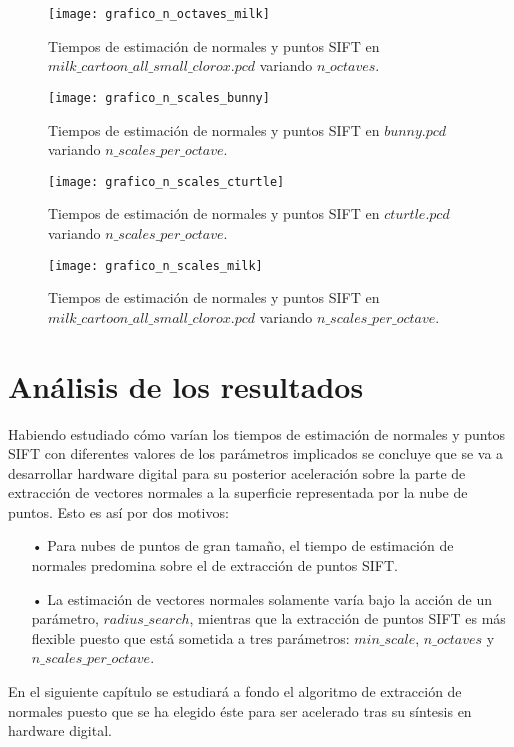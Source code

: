 \begin{figure}[h!]
\centering
\texttt{[image: grafico\_n\_octaves\_milk]}
\caption{Tiempos de estimación de normales y puntos SIFT en $milk\_cartoon\_all\_small\_clorox.pcd$ variando $n\_octaves$.}\label{fig:grafico_n_octaves_milk}
\end{figure}


\begin{figure}[h!]
\centering
\texttt{[image: grafico\_n\_scales\_bunny]}
\caption{Tiempos de estimación de normales y puntos SIFT en $bunny.pcd$ variando $n\_scales\_per\_octave$.}\label{fig:grafico_n_scales_bunny}
\end{figure}

\begin{figure}[h!]
\centering
\texttt{[image: grafico\_n\_scales\_cturtle]}
\caption{Tiempos de estimación de normales y puntos SIFT en $cturtle.pcd$ variando $n\_scales\_per\_octave$.}\label{fig:grafico_n_scales_cturtle}
\end{figure}


\begin{figure}[h!]
\centering
\texttt{[image: grafico\_n\_scales\_milk]}
\caption{Tiempos de estimación de normales y puntos SIFT en $milk\_cartoon\_all\_small\_clorox.pcd$ variando $n\_scales\_per\_octave$.}\label{fig:grafico_n_scales_milk}
\end{figure}


\section{Análisis de los resultados}
Habiendo estudiado cómo varían los tiempos de estimación de normales y puntos SIFT con diferentes valores de los parámetros implicados se concluye que se va a desarrollar hardware digital para su posterior aceleración sobre la parte de extracción de vectores normales a la superficie representada por la nube de puntos. Esto es así por dos motivos:

\begin{itemize}
\item[•]Para nubes de puntos de gran tamaño, el tiempo de estimación de normales predomina sobre el de extracción de puntos SIFT.
\item[•]La estimación de vectores normales solamente varía bajo la acción de un parámetro, $radius\_search$, mientras que la extracción de puntos SIFT es más flexible puesto que está sometida a tres parámetros: $min\_scale$, $n\_octaves$ y $n\_scales\_per\_octave$.
\end{itemize}

En el siguiente capítulo se estudiará a fondo el algoritmo de extracción de normales puesto que se ha elegido éste para ser acelerado tras su síntesis en hardware digital.